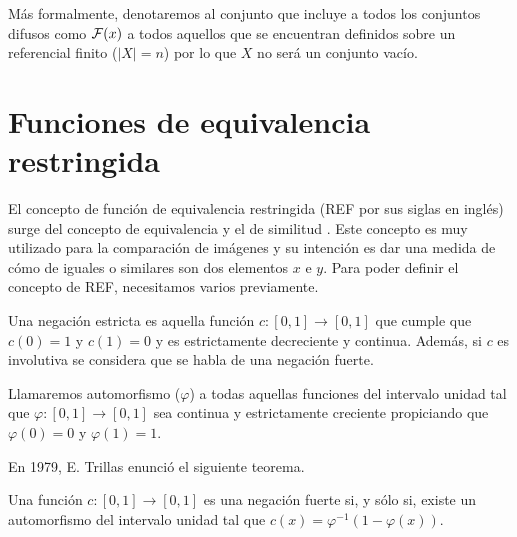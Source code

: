 Más formalmente, denotaremos al conjunto que incluye a todos los conjuntos difusos como $\mathcal{F}(x)$ a todos aquellos que se encuentran definidos sobre un referencial finito ($|X| = n$) por lo que $X$ no será un conjunto vacío.
 

\section{Funciones de equivalencia restringida}\label{sec:ref}
El concepto de función de equivalencia restringida (REF por sus siglas en inglés) surge del concepto de equivalencia y el de similitud \cite{art:refbarrenechea}. Este concepto es muy utilizado para la comparación de imágenes y su intención es dar una medida de cómo de iguales o similares son dos elementos $x$ e $y$. Para poder definir el concepto de REF, necesitamos varios previamente. 

\begin{definition}\label{def:negacionestricta}
Una negación estricta es aquella función $c : [0, 1] \rightarrow [0, 1]$ que cumple que $c(0)=1$ y $c(1)=0$ y es estrictamente decreciente y continua. Además, si $c$ es involutiva se considera que se habla de una negación fuerte.
\end{definition}

\begin{definition}\label{def:automorfismo}
Llamaremos automorfismo ($\varphi$) a todas aquellas funciones del intervalo unidad tal que $\varphi : [0, 1] \rightarrow [0, 1]$ sea continua y estrictamente creciente propiciando que $\varphi(0)=0$ y $\varphi(1)=1$.
\end{definition}

En 1979, E. Trillas \cite{art:thtrillas} enunció el siguiente teorema. 
\begin{theorem}\label{th:trillas}
Una función $c : [0, 1] \rightarrow [0, 1]$ es una negación fuerte si, y sólo si, existe un automorfismo del intervalo unidad tal que $c(x)=\varphi^{-1}(1-\varphi(x))$.
\end{theorem}

